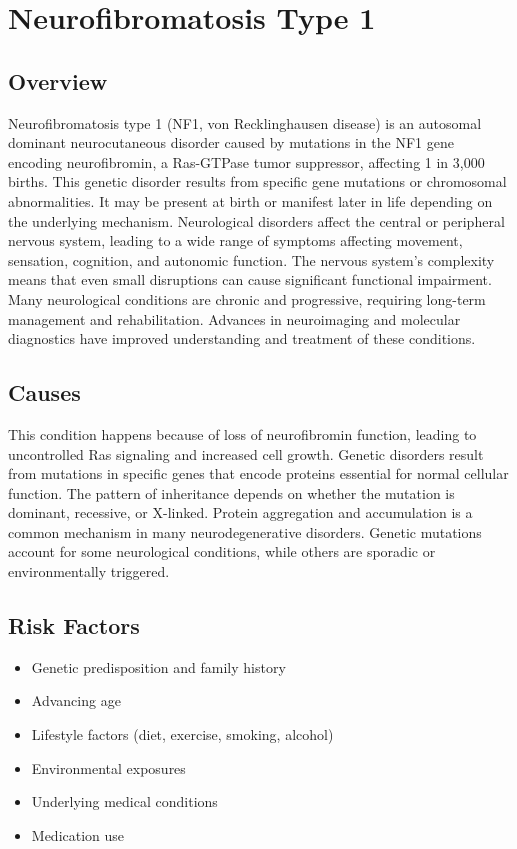 \chapter{Neurofibromatosis Type 1}
\label{sec:Neurofibromatosis Type 1}

\section{Overview}
Neurofibromatosis type 1 (NF1, von Recklinghausen disease) is an autosomal dominant neurocutaneous disorder caused by mutations in the NF1 gene encoding neurofibromin, a Ras-GTPase tumor suppressor, affecting 1 in 3,000 births. This genetic disorder results from specific gene mutations or chromosomal abnormalities. It may be present at birth or manifest later in life depending on the underlying mechanism. Neurological disorders affect the central or peripheral nervous system, leading to a wide range of symptoms affecting movement, sensation, cognition, and autonomic function. The nervous system's complexity means that even small disruptions can cause significant functional impairment. Many neurological conditions are chronic and progressive, requiring long-term management and rehabilitation. Advances in neuroimaging and molecular diagnostics have improved understanding and treatment of these conditions.
\section{Causes}
This condition happens because of loss of neurofibromin function, leading to uncontrolled Ras signaling and increased cell growth. Genetic disorders result from mutations in specific genes that encode proteins essential for normal cellular function. The pattern of inheritance depends on whether the mutation is dominant, recessive, or X-linked.  Protein aggregation and accumulation is a common mechanism in many neurodegenerative disorders.  Genetic mutations account for some neurological conditions, while others are sporadic or environmentally triggered.   
\section{Risk Factors}
\begin{itemize}[noitemsep]
  \item Genetic predisposition and family history
  \item Advancing age
  \item Lifestyle factors (diet, exercise, smoking, alcohol)
  \item Environmental exposures
  \item Underlying medical conditions
  \item Medication use
\end{itemize}
